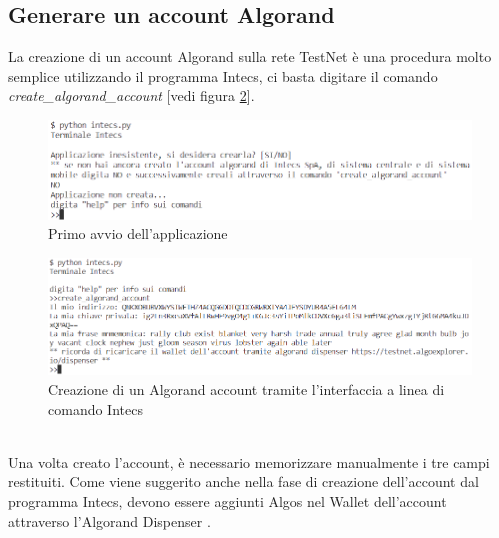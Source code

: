 \subsection{Generare un account Algorand}\label{generareaccountalgorand}
La creazione di un account Algorand sulla rete TestNet è una procedura molto semplice utilizzando il programma Intecs, ci basta digitare il comando \textit{create\_algorand\_account} [vedi figura \ref{fig: intecs_create_algorand_account}].
\begin{figure}[!h]
\flushleft
\includegraphics[scale=0.8]{images/Intecs/primo_avvio.png}
\caption{Primo avvio dell'applicazione}
\label{fig: intecs_primoavvio_ }
\end{figure}
\begin{figure}[!h]
\centering
\includegraphics[scale=0.8]{images/Intecs/create_algorand_account.png}
\caption{Creazione di un Algorand account tramite l'interfaccia a linea di comando Intecs}
\label{fig: intecs_create_algorand_account}
\end{figure}\\
Una volta creato l'account, è necessario memorizzare manualmente i tre campi restituiti. Come viene suggerito anche nella fase di creazione dell'account dal programma Intecs, devono essere aggiunti Algos nel Wallet dell'account attraverso l'Algorand Dispenser \cite{algoranddispenser}.

